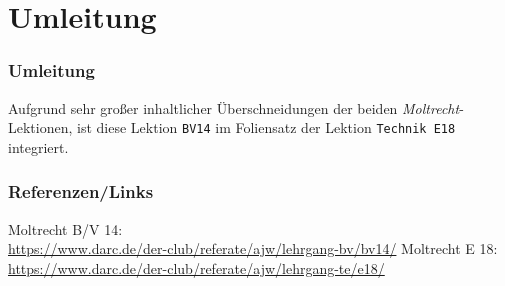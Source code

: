 

\subtitle{Betriebstechnik/Vorschriften 14: \\
          Störungen, EMV und EMVU, Sicherheit \\[2em]}
\date{Stand 21.12.2015}


\section{Umleitung}

\begin{frame}
    \frametitle{Umleitung}

    Aufgrund sehr großer inhaltlicher Überschneidungen der beiden
    \emph{Moltrecht}-Lektionen, ist diese Lektion
    \texttt{BV14}\hyperlink{refs}{\cite{bv14}} im Foliensatz der Lektion
    \texttt{Technik E18}\hyperlink{refs}{\cite{e18}} integriert.

\end{frame}

\renewcommand{\refname}{Referenzen}

\begin{frame}
    \frametitle{Referenzen/Links}
    \hypertarget{refs}{}
    \footnotesize

    \begin{thebibliography}{}
          Moltrecht B/V 14: \\
                        \url{https://www.darc.de/der-club/referate/ajw/lehrgang-bv/bv14/}
           Moltrecht E 18: \\
                        \url{https://www.darc.de/der-club/referate/ajw/lehrgang-te/e18/}
    \end{thebibliography} 
   
\end{frame}


